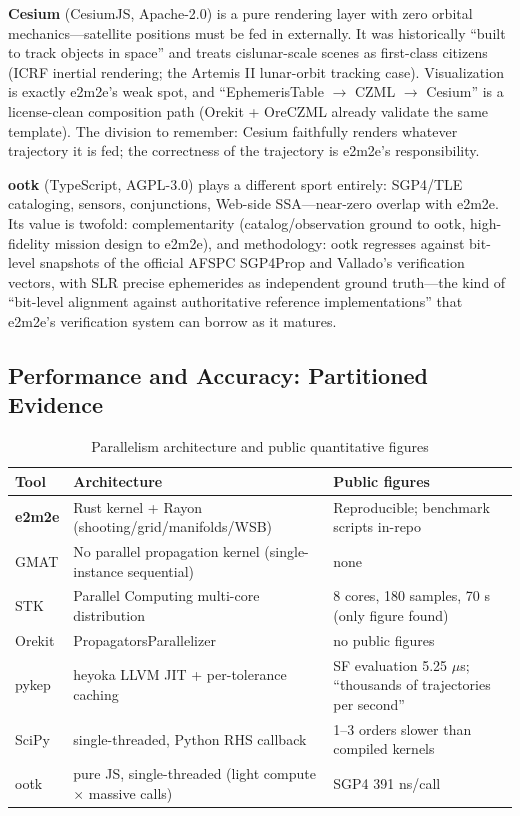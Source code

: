 \textbf{Cesium} (CesiumJS, Apache-2.0) is a pure rendering layer with zero
orbital mechanics---satellite positions must be fed in externally. It was
historically ``built to track objects in space'' and treats cislunar-scale
scenes as first-class citizens (ICRF inertial rendering; the Artemis II
lunar-orbit tracking case). Visualization is exactly e2m2e's weak spot, and
``EphemerisTable $\to$ CZML $\to$ Cesium'' is a license-clean composition
path (Orekit + OreCZML already validate the same template). The division to
remember: Cesium faithfully renders whatever trajectory it is fed; the
correctness of the trajectory is e2m2e's responsibility.

\textbf{ootk} (TypeScript, AGPL-3.0) plays a different sport entirely:
SGP4/TLE cataloging, sensors, conjunctions, Web-side SSA---near-zero overlap
with e2m2e. Its value is twofold: complementarity (catalog/observation
ground to ootk, high-fidelity mission design to e2m2e), and methodology:
ootk regresses against bit-level snapshots of the official AFSPC SGP4Prop
and Vallado's verification vectors, with SLR precise ephemerides as
independent ground truth---the kind of ``bit-level alignment against
authoritative reference implementations'' that e2m2e's verification system
can borrow as it matures.

\subsection{Performance and Accuracy: Partitioned Evidence}

\begin{table}[htbp]
\centering\small
\caption{Parallelism architecture and public quantitative figures}
\label{tab:perf}
\begin{tabularx}{\textwidth}{@{}lXl@{}}
\toprule
\textbf{Tool} & \textbf{Architecture} & \textbf{Public figures} \\
\midrule
\textbf{e2m2e} & Rust kernel + Rayon (shooting/grid/manifolds/WSB) &
Reproducible; benchmark scripts in-repo \\
GMAT & No parallel propagation kernel (single-instance sequential) & none \\
STK & Parallel Computing multi-core distribution & 8 cores, 180 samples,
70 s (only figure found) \\
Orekit & PropagatorsParallelizer & no public figures \\
pykep & heyoka LLVM JIT + per-tolerance caching & SF evaluation
5.25 $\mu$s; ``thousands of trajectories per second'' \\
SciPy & single-threaded, Python RHS callback & 1--3 orders slower than
compiled kernels \\
ootk & pure JS, single-threaded (light compute $\times$ massive calls) &
SGP4 391 ns/call \\
\bottomrule
\end{tabularx}
\end{table}


